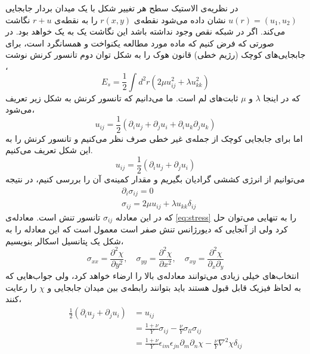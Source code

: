 در نظریه‌ی الاستیک سطح هر تغییر شکل با یک میدان بردار جابجایی 
$u(r)=(u_1,u_2)$
نشان داده می‌شود نقطه‌ی 
$r(x,y)$
را به نقطه‌ی 
$r+u$
نگاشت می‌کند. اگر در شبکه نقص وجود نداشته باشد این نگاشت یک به یک خواهد بود. در صورتی که فرض کنیم که ماده مورد مطالعه یکنواخت و همسانگرد است، برای جابجایی‌های کوچک (رژیم خطی) قانون هوک را به شکل توان دوم تانسور کرنش نوشت
،
\begin{equation}
E_s=\frac{1}{2}\int d^2r(2\mu u_{ij}^2+\lambda u_{kk}^2)
\label{eq:energylame}
\end{equation}
که در اینجا $\lambda$
و $\mu$
ثابت‌های لم
است. ما می‌دانیم که تانسور کرنش به شکل زیر تعریف می‌شود،
\begin{equation}
u_{ij}=\frac{1}{2}(\partial_i u_j+\partial_j u_i+\partial_i u_k\partial_j u_k)
\end{equation}
اما برای جابجایی کوچک از جمله‌ی غیر خطی صرف نظر می‌کنیم و تانسور کرنش را به این شکل تعریف می‌کنیم.
\begin{equation}
u_{ij}=\frac{1}{2}(\partial_i u_j+\partial_j u_i)
\label{eq:simplestrain}
\end{equation}
می‌توانیم  از انرژی کششی گرادیان بگیریم و مقدار کمینه‌ی آن را بررسی کنیم، در نتیجه
\begin{equation}
\begin{aligned}
&\partial_i\sigma_{ij}=0\\
&\sigma_{ij}=2\mu u_{ij}+\lambda u_{kk}\delta_{ij}
\label{eq:stress}
\end{aligned}
\end{equation}
که در این معادله 
$\sigma_{ij}$
تانسور تنش است. معادله‌ی 
\ref{eq:stress}
را به تنهایی می‌توان حل کرد ولی از آنجایی که دیورژانس تنش صفر است معمول است که این معادله را به شکل یک پتانسیل اسکالر بنویسیم،
\begin{equation}
\sigma_{xx}=\frac{\partial^2\chi}{\partial y^2},\quad\sigma_{yy}=\frac{\partial^2\chi}{\partial x^2},\quad\sigma_{xy}=\frac{\partial^2\chi}{\partial_x\partial_y} 
\end{equation}
انتخاب‌های خیلی زیادی می‌توانند معادله‌ی بالا را ارضاء خواهد کرد، ولی جواب‌هایی که به لحاظ فیزیک قابل قبول هستند باید بتوانند رابطه‌ی بین میدان جابجایی و 
$\chi$
را رعایت کنند،
\begin{equation}
\begin{aligned}
\frac{1}{2}(\partial_iu_j+\partial_ju_i)&=u_{ij}\\
&=\frac{1+\nu}{Y}\sigma_{ij}-\frac{\nu}{Y}\sigma_{ll}\sigma_{ij}\\
&=\frac{1+\nu}{Y}\epsilon_{im}\epsilon_{jn}\partial_{m}\partial_{n}\chi-\frac{\nu}{Y}\nabla^2\chi\delta_{ij}
\label{eq:constraint}
\end{aligned}
\end{equation}
